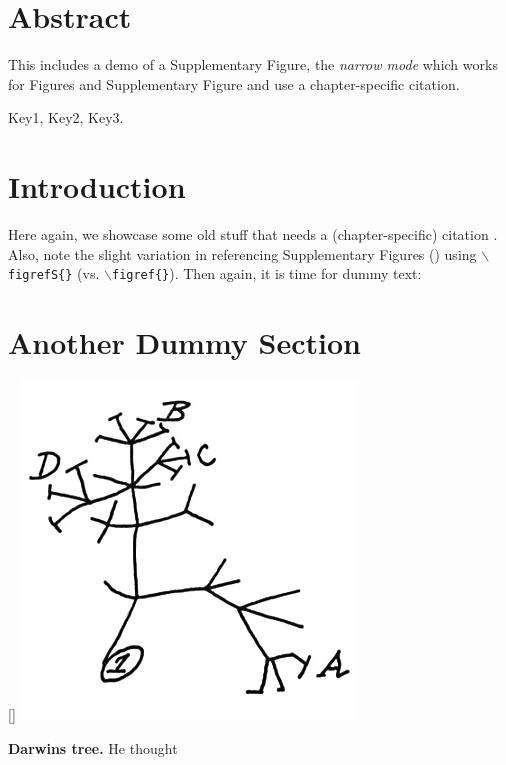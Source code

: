 \section*{Abstract}
This includes a demo of a Supplementary Figure, the \textit{narrow mode} which works for Figures and Supplementary Figure and use a chapter-specific citation.

 Key1, Key2, Key3.

\begin{multicols}{2}
\section{Introduction}
\noindent
Here again, we showcase some old stuff that needs a (chapter-specific) citation .
Also, note the slight variation in referencing Supplementary Figures () using \texttt{$\backslash$figrefS\{\}} (vs. \texttt{$\backslash$figref\{\}}).
Then again, it is time for dummy text: 

\section{Another Dummy Section}
\begin{supplFigure*}[!t]
[\FBwidth]
{\includegraphics[width = .5\fwidth]{figures/c1/tree.jpg}}
{\caption[Darwins tree]{\label{fig:c1s1}\textbf{Darwins tree.}
He thought}}
\end{supplFigure*}

\textcolor{black!35}{\lipsum[2-4]}

\end{multicols}